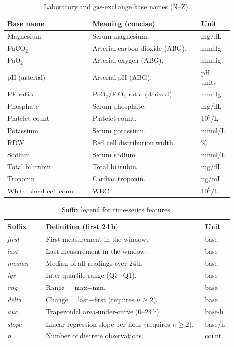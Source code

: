\vspace{0.5\baselineskip}
\begin{table}[t]\centering
{\small\renewcommand{\arraystretch}{1.12}\setlength{\tabcolsep}{6pt}%
\caption{Laboratory and gas-exchange base names (N--Z).}
\label{app:tab-labs-n-z}
\begin{tabular}{P{0.36\linewidth} P{0.46\linewidth} P{0.10\linewidth}}
\toprule
\textbf{Base name} & \textbf{Meaning (concise)} & \textbf{Unit}\\
\midrule
Magnesium & Serum magnesium. & mg/dL\\
PaCO$_2$ & Arterial carbon dioxide (ABG). & mmHg\\
PaO$_2$ & Arterial oxygen (ABG). & mmHg\\
pH (arterial) & Arterial pH (ABG). & pH units\\
PF ratio & PaO$_2$/FiO$_2$ ratio (derived). & mmHg\\
Phosphate & Serum phosphate. & mg/dL\\
Platelet count & Platelet count. & $10^{9}$/L\\
Potassium & Serum potassium. & mmol/L\\
RDW & Red cell distribution width. & \%\\
Sodium & Serum sodium. & mmol/L\\
Total bilirubin & Total bilirubin. & mg/dL\\
Troponin & Cardiac troponin. & ng/mL\\
White blood cell count & WBC. & $10^{9}$/L\\
\bottomrule
\end{tabular}}
\end{table}

\vspace{0.75\baselineskip}
\begin{table}[t]\centering
{\small\renewcommand{\arraystretch}{1.12}\setlength{\tabcolsep}{6pt}%
\caption{Suffix legend for time-series features.}
\label{app:tab-suffixes}
\begin{tabular}{P{0.16\linewidth} P{0.66\linewidth} P{0.10\linewidth}}
\toprule
\textbf{Suffix} & \textbf{Definition (first 24\,h)} & \textbf{Unit}\\
\midrule
\textit{first}  & First measurement in the window. & base\\
\textit{last}   & Last measurement in the window. & base\\
\textit{median} & Median of all readings over 24\,h. & base\\
\textit{iqr}    & Inter-quartile range (Q3$-$Q1). & base\\
\textit{rng}    & Range = max$-$min. & base\\
\textit{delta}  & Change = last$-$first (requires $n\ge2$). & base\\
\textit{auc}    & Trapezoidal area-under-curve (0--24\,h). & base$\cdot$h\\
\textit{slope}  & Linear regression slope per hour (requires $n\ge2$). & base/h\\
\textit{n}      & Number of discrete observations. & count\\
\bottomrule
\end{tabular}}
\end{table}